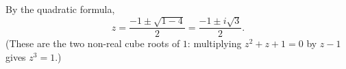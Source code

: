 By the quadratic formula,
\[z=\dfrac{-1\pm\sqrt{1-4}}{2}=\boxed{\dfrac{-1\pm i\sqrt3}{2}}.\]
(These are the two non-real cube roots of $1$: multiplying $z^2+z+1=0$ by $z-1$ gives $z^3=1$.)
